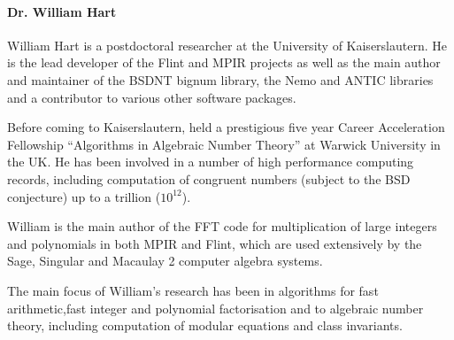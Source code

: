 \paragraph{Dr. William Hart}

William Hart is a postdoctoral researcher at the University of
Kaiserslautern. He is the lead developer of the Flint and MPIR projects
as well as the main author and maintainer of the BSDNT bignum library, the
Nemo and ANTIC libraries and a contributor to various other software packages.

Before coming to Kaiserslautern, held a prestigious five year Career
Acceleration Fellowship ``Algorithms in Algebraic Number Theory'' at Warwick 
University in the UK. He has been involved in a number of high performance
computing records, including computation of congruent numbers (subject to the 
BSD conjecture) up to a trillion ($10^{12}$).

William is the main author of the FFT code for multiplication of large integers
and polynomials in both MPIR and Flint, which are used extensively by the Sage,
Singular and Macaulay 2 computer algebra systems.

The main focus of William's research has been in algorithms for fast arithmetic,fast integer and polynomial factorisation and to algebraic number theory,
including computation of modular equations and class invariants.

